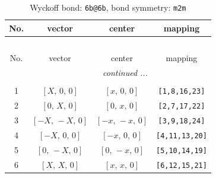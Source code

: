 \documentclass[fleqn,8pt]{jsarticle}
\begin{document}
\renewcommand{\arraystretch}{1.2}
\begin{longtable}{cccc}
\caption{Wyckoff bond: {\tt 6b@6b}, bond symmetry: {\tt m2m}}
 \\
 \hline \hline
No. & vector & center & mapping \\ \hline \endfirsthead

\multicolumn{3}{l}{\tablename\ \thetable{}} \\
 \hline \hline
No. & vector & center & mapping \\ \hline \endhead

 \hline \hline
\multicolumn{3}{r}{\footnotesize\it continued ...} \\ \endfoot

 \hline \hline
\multicolumn{3}{r}{} \\ \endlastfoot

1 & $\left[ X,\, 0,\, 0 \right]$ & $\left[ x,\, 0,\, 0 \right]$ & {\tt [1,8,16,23]} \\ \hline
2 & $\left[ 0,\, X,\, 0 \right]$ & $\left[ 0,\, x,\, 0 \right]$ & {\tt [2,7,17,22]} \\ \hline
3 & $\left[ - X,\, - X,\, 0 \right]$ & $\left[ - x,\, - x,\, 0 \right]$ & {\tt [3,9,18,24]} \\ \hline
4 & $\left[ - X,\, 0,\, 0 \right]$ & $\left[ - x,\, 0,\, 0 \right]$ & {\tt [4,11,13,20]} \\ \hline
5 & $\left[ 0,\, - X,\, 0 \right]$ & $\left[ 0,\, - x,\, 0 \right]$ & {\tt [5,10,14,19]} \\ \hline
6 & $\left[ X,\, X,\, 0 \right]$ & $\left[ x,\, x,\, 0 \right]$ & {\tt [6,12,15,21]} \\
\end{longtable}
\renewcommand{\arraystretch}{1.2}
\end{document}
